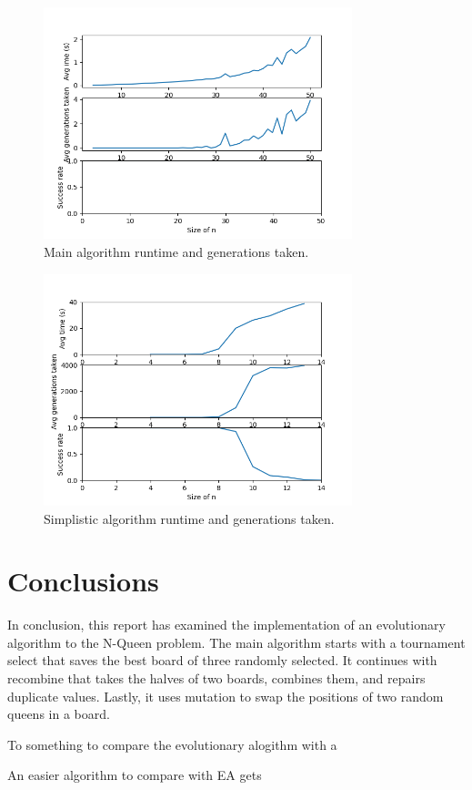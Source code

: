 \documentclass{scrartcl}
\begin{document}
\begin{figure}[H]
    \centering
    \includegraphics[width=0.8\textwidth]{figure1.png}
    \caption{Main algorithm runtime and generations taken.}
    \label{fig:main}
\end{figure}

\begin{figure}[H]
    \centering
    \includegraphics[width=0.8\textwidth]{figure2.png}
    \caption{Simplistic algorithm runtime and generations taken.}
    \label{fig:simplistic}
\end{figure}

\section{Conclusions}
\label{sec:conclusions}

In conclusion, this report has examined the implementation of an evolutionary algorithm to the N-Queen problem. The main algorithm starts with a tournament select that saves the best board of three randomly selected. It continues with recombine that takes the halves of two boards, combines them, and repairs duplicate values. Lastly, it uses mutation to swap the positions of two random queens in a board. 

To something to compare the evolutionary alogithm with a 

An easier algorithm to compare with
EA gets



\end{document}
